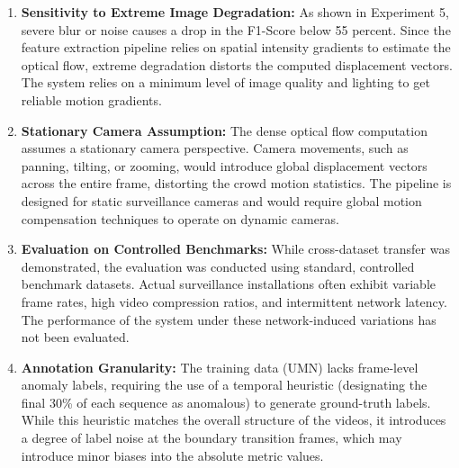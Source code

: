 \begin{enumerate}
  \item \textbf{Sensitivity to Extreme Image Degradation:} As shown in Experiment 5, severe blur or noise causes a drop in the F1-Score below 55 percent. Since the feature extraction pipeline relies on spatial intensity gradients to estimate the optical flow, extreme degradation distorts the computed displacement vectors. The system relies on a minimum level of image quality and lighting to get reliable motion gradients.
  \item \textbf{Stationary Camera Assumption:} The dense optical flow computation assumes a stationary camera perspective. Camera movements, such as panning, tilting, or zooming, would introduce global displacement vectors across the entire frame, distorting the crowd motion statistics. The pipeline is designed for static surveillance cameras and would require global motion compensation techniques to operate on dynamic cameras.
  \item \textbf{Evaluation on Controlled Benchmarks:} While cross-dataset transfer was demonstrated, the evaluation was conducted using standard, controlled benchmark datasets. Actual surveillance installations often exhibit variable frame rates, high video compression ratios, and intermittent network latency. The performance of the system under these network-induced variations has not been evaluated.
  \item \textbf{Annotation Granularity:} The training data (UMN) lacks frame-level anomaly labels, requiring the use of a temporal heuristic (designating the final 30\% of each sequence as anomalous) to generate ground-truth labels. While this heuristic matches the overall structure of the videos, it introduces a degree of label noise at the boundary transition frames, which may introduce minor biases into the absolute metric values.
\end{enumerate}
